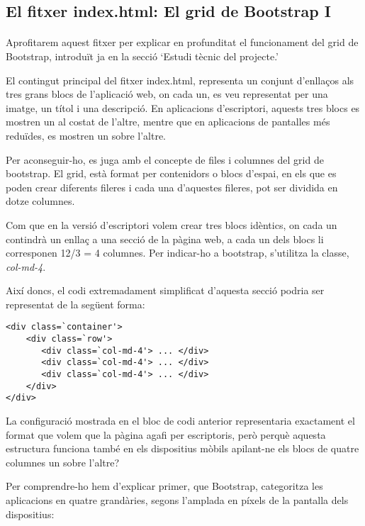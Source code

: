 \subsection{El fitxer index.html: El grid de Bootstrap I}

    \paragraph{}
    Aprofitarem aquest fitxer per explicar en profunditat el funcionament del grid de Bootstrap, introduït ja en la secció `Estudi tècnic del projecte.'

    El contingut principal del fitxer index.html, representa un conjunt d'enllaços als tres grans blocs de l'aplicació web, on cada un, es veu representat per una imatge, un títol i una descripció. En aplicacions d'escriptori, aquests tres blocs es mostren un al costat de l'altre, mentre que en aplicacions de pantalles més reduïdes, es mostren un sobre l'altre.

    Per aconseguir-ho, es juga amb el concepte de files i columnes del grid de bootstrap. El grid, està format per contenidors o blocs d'espai, en els que es poden crear diferents fileres i cada una d'aquestes fileres, pot ser dividida en dotze columnes.

    Com que en la versió d'escriptori volem crear tres blocs idèntics, on cada un contindrà un enllaç a una secció de la pàgina web, a cada un dels blocs li corresponen 12/3 = 4 columnes. Per indicar-ho a bootstrap, s'utilitza la classe, \emph{col-md-4}.

    Així doncs, el codi extremadament simplificat d'aquesta secció podria ser representat de la següent forma:

    \begin{lstlisting}[style=rawOwn,caption={Exemple bàsic de divisió d'una filera en tres columnes}]
<div class=`container'>
    <div class=`row'>
	   <div class=`col-md-4'> ... </div>
       <div class=`col-md-4'> ... </div>
       <div class=`col-md-4'> ... </div>
	</div>
</div>
    \end{lstlisting}

    La configuració mostrada en el bloc de codi anterior representaria exactament el format que volem que la pàgina agafi per escriptoris, però perquè aquesta estructura funciona també en els dispositius mòbils apilant-ne els blocs de quatre columnes un sobre l'altre?

    Per comprendre-ho hem d'explicar primer, que Bootstrap, categoritza les aplicacions en quatre grandàries, segons l'amplada en píxels de la pantalla dels dispositius:

